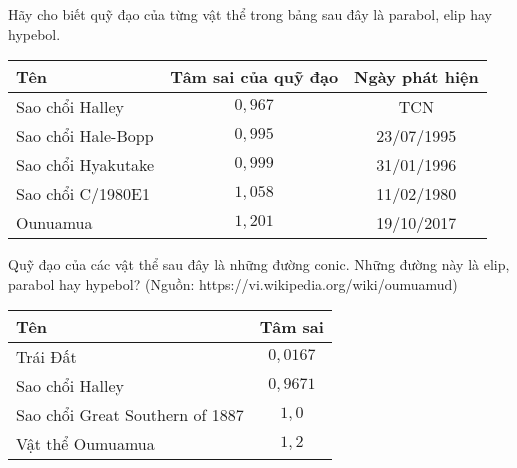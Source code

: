\begin{vd}%
Hãy cho biết quỹ đạo của từng vật thể trong bảng sau đây là parabol, elip hay hypebol.
\begin{center}
\begin{tabular}{|l|c|c|}
	\hline 
	\centering Tên & Tâm sai của quỹ đạo & Ngày phát hiện\\
	\hline 
	Sao chổi Halley & $ 0{,}967 $ & TCN\\
	\hline
	Sao chổi Hale-Bopp & $ 0{,}995 $ & 23/07/1995\\
	\hline
	Sao chổi Hyakutake & $ 0{,}999 $ & 31/01/1996\\
	\hline
	Sao chổi C/1980E1 & $ 1{,}058 $ & 11/02/1980\\
	\hline
	Ounuamua & $ 1{,}201 $ &19/10/2017\\
	\hline
\end{tabular}
\end{center}
\end{vd}
\begin{vd}%
Quỹ đạo của các vật thể sau đây là những đường conic. Những đường này là elip, parabol hay hypebol? (Nguồn: https://vi.wikipedia.org/wiki/oumuamud)
\begin{center}
\begin{tabular}{|l|c|}
	\hline 
	\centering Tên & Tâm sai \\
	\hline 
	Trái Đất  & $ 0{,}0167 $ \\
	\hline
	Sao chổi Halley & $ 0{,}9671 $ \\
	\hline
	Sao chổi Great Southern of 1887& $ 1{,}0 $ \\
	\hline
	Vật thể Oumuamua & $ 1{,}2 $ \\
	\hline
\end{tabular}
\end{center}
\end{vd}
